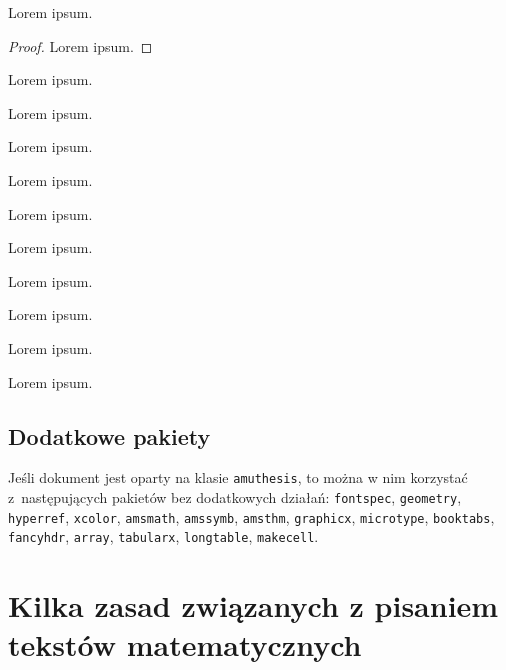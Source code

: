 \documentclass[oneside,polski]{amuthesis}
\begin{document}
\begin{theorem}Lorem ipsum.\end{theorem}
\begin{proof}Lorem ipsum.\end{proof}
\begin{lemma}Lorem ipsum.\end{lemma}
\begin{statement}Lorem ipsum.\end{statement}
\begin{proposition}Lorem ipsum.\end{proposition}
\begin{corollary}Lorem ipsum.\end{corollary}
\begin{remark}Lorem ipsum.\end{remark}
\begin{note}Lorem ipsum.\end{note}
\begin{definition}Lorem ipsum.\end{definition}
\begin{example}Lorem ipsum.\end{example}
\begin{task}Lorem ipsum.\end{task}
\begin{exercise}Lorem ipsum.\end{exercise}

\section{Dodatkowe pakiety}

Jeśli dokument jest oparty na klasie \texttt{amuthesis}, to można w nim korzystać z~następujących pakietów bez dodatkowych działań:
\texttt{fontspec},  \texttt{geometry},  \texttt{hyperref},  \texttt{xcolor},
\texttt{amsmath},   \texttt{amssymb},   \texttt{amsthm},    \texttt{graphicx},
\texttt{microtype}, \texttt{booktabs},  \texttt{fancyhdr},  \texttt{array},
\texttt{tabularx},  \texttt{longtable}, \texttt{makecell}.

\chapter{Kilka zasad związanych z pisaniem tekstów matematycznych}

\lipsum[1-4]
\end{document}
